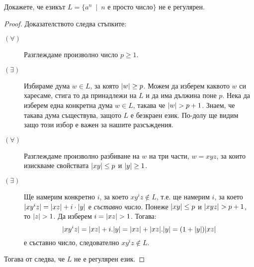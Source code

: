 \begin{extra}
\begin{problem}
  Докажете, че езикът $L = \{a^n\ \mid\ n\mbox{ е просто число}\}$ не е регулярен.
\end{problem}
\begin{proof}
  Доказателството следва стъпките:
  \begin{description}
  \item[$(\forall)$] 
    Разглеждаме произволно число $p \geq 1$.
  \item[$(\exists)$]
    Избираме дума $w \in L$, за която $\vert{w}\vert \geq p$. Можем да изберем каквото $w$ 
    си харесаме, стига то да принадлежи на $L$ и да има дължина поне $p$.
    Нека да изберем една конкретна дума $w \in L$, такава че $\vert{w}\vert > p+1$.
    Знаем, че такава дума съществува, защото $L$ е безкраен език. По-долу ще видим защо този избор е важен за нашите разсъждения.
  \item[$(\forall)$]
    Разглеждаме произволно разбиване на $w$ на три части, $w = xyz$,
    за които изискваме свойствата $\vert{xy}\vert \leq p$ и $\vert{y}\vert \geq 1$.
  \item[$(\exists)$]
    Ще намерим конкретно $i$, за което $xy^iz \not\in L$,
    т.е. ще намерим $i$, за което 
    $\vert{xy^iz}\vert = \vert{xz}\vert + i\cdot\vert{y}\vert$ е {\em съставно число}.
    Понеже $\vert{xy}\vert \leq p$ и $\vert{xyz}\vert > p+1$, то $\vert{z}\vert > 1$.
    Да изберем $i = \vert{xz}\vert > 1$. Тогава:
    \[\vert{xy^iz}\vert = \vert{xz}\vert + i.\vert{y}\vert = \vert{xz}\vert + \vert{xz}\vert.\vert{y}\vert = (1 + \vert{y}\vert)\vert{xz}\vert\] е съставно число, следователно 
    $xy^iz \not\in L$.
  \end{description}
  Тогава от  следва, че $L$ не е регулярен език.
\end{proof}


\end{extra}

